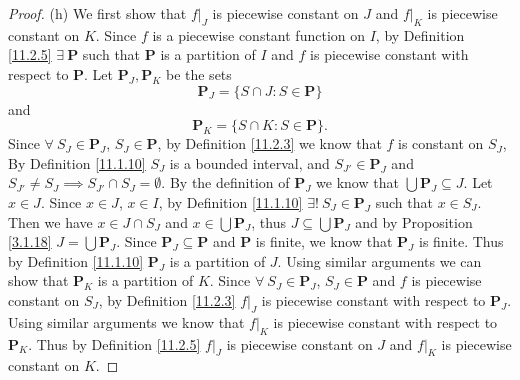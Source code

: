 \begin{proof}{(h)}
    We first show that \(f|_J\) is piecewise constant on \(J\) and \(f|_K\) is piecewise constant on \(K\).
    Since \(f\) is a piecewise constant function on \(I\), by Definition \ref{11.2.5} \(\exists\ \mathbf{P}\) such that \(\mathbf{P}\) is a partition of \(I\) and \(f\) is piecewise constant with respect to \(\mathbf{P}\).
    Let \(\mathbf{P}_J, \mathbf{P}_K\) be the sets
    \[
        \mathbf{P}_J = \{S \cap J : S \in \mathbf{P}\}
    \]
    and
    \[
        \mathbf{P}_K = \{S \cap K : S \in \mathbf{P}\}.
    \]
    Since \(\forall\ S_J \in \mathbf{P}_J\), \(S_J \in \mathbf{P}\), by Definition \ref{11.2.3} we know that \(f\) is constant on \(S_J\),
    By Definition \ref{11.1.10} \(S_J\) is a bounded interval, and \(S_{J'} \in \mathbf{P}_J\) and \(S_{J'} \neq S_J \implies S_{J'} \cap S_J = \emptyset\).
    By the definition of \(\mathbf{P}_J\) we know that \(\bigcup \mathbf{P}_J \subseteq J\).
    Let \(x \in J\).
    Since \(x \in J\), \(x \in I\), by Definition \ref{11.1.10} \(\exists!\ S_J \in \mathbf{P}_J\) such that \(x \in S_J\).
    Then we have \(x \in J \cap S_J\) and \(x \in \bigcup \mathbf{P}_J\), thus \(J \subseteq \bigcup \mathbf{P}_J\) and by Proposition \ref{3.1.18} \(J = \bigcup \mathbf{P}_J\).
    Since \(\mathbf{P}_J \subseteq \mathbf{P}\) and \(\mathbf{P}\) is finite, we know that \(\mathbf{P}_J\) is finite.
    Thus by Definition \ref{11.1.10} \(\mathbf{P}_J\) is a partition of \(J\).
    Using similar arguments we can show that \(\mathbf{P}_K\) is a partition of \(K\).
    Since \(\forall\ S_J \in \mathbf{P}_J\), \(S_J \in \mathbf{P}\) and \(f\) is piecewise constant on \(S_J\), by Definition \ref{11.2.3} \(f|_J\) is piecewise constant with respect to \(\mathbf{P}_J\).
    Using similar arguments we know that \(f|_K\) is piecewise constant with respect to \(\mathbf{P}_K\).
    Thus by Definition \ref{11.2.5} \(f|_J\) is piecewise constant on \(J\) and \(f|_K\) is piecewise constant on \(K\).


\end{proof}
